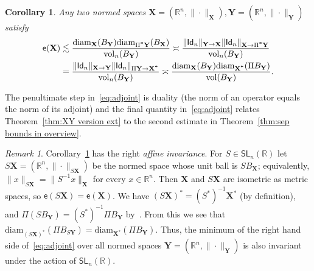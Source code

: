 \documentclass[11pt,reqno]{amsart}
\newcommand{\diam}{\mathrm{diam}}
\newcommand{\vr}{\mathrm{vr}}
\newcommand{\X}{\mathbf X}
\newcommand{\Y}{\mathbf Y}
\newcommand{\R}{\mathbb R}
\newtheorem{corollary}[theorem]{Corollary}
\theoremstyle{remark}
\newtheorem{remark}[theorem]{Remark}
\newcommand{\Id}{\mathsf{Id}}
\newcommand{\SL}{\mathsf{SL}}
\newcommand{\ee}{\mathsf{e}}
\newcommand{\vol}{\mathrm{vol}}
\renewcommand{\1}{\mathbf 1}
\begin{document}
\begin{corollary}\label{coro:analytic and geometric restatements} Any two normed spaces $\X=(\R^n,\|\cdot\|_{\X}), \Y=(\R^n,\|\cdot\|_{\Y})$ satisfy
\begin{align}\label{eq:adjoint}
\begin{split}
\ee(\X)&\lesssim  \frac{\diam_\X(B_\Y)\diam_{\Pi^{\textbf *} \Y}(B_\X)}{\vol_n(B_{\Y})}
\asymp  \frac{\|\Id_n\|_{\Y\to \X}\|\Id_n\|_{\X\to \Pi^{\textbf *} \Y}}{\vol_n(B_{\Y})}\\&=\frac{\|\Id_n\|_{\X\to \Y}\|\Id_n\|_{\Pi \Y\to \X^{\textbf *}}}{\vol_n(B_{\Y})}\asymp \frac{\diam_\X(B_\Y)\diam_{\X^{\textbf{*}}}(\Pi B_\Y)}{\vol(B_{\Y})}.
\end{split}
\end{align}
\end{corollary}
The penultimate step in~\eqref{eq:adjoint} is  duality (the norm of an operator equals the norm of its adjoint) and the final quantity in~\eqref{eq:adjoint} relates  Theorem~\ref{thm:XY version ext} to the second estimate in Theorem~\ref{thm:sep bounds in overview}.

\begin{remark}\label{rem:affine invariance} Corollary~\ref{coro:analytic and geometric restatements} has the right {\em affine invariance}. For  $S\in \SL_n(\R)$ let $S\X=(\R^n,\|\cdot\|_{S\X})$ be the normed space whose unit ball is $SB_\X$; equivalently, $\|x\|_{S\X}=\|S^{-1}x\|_\X$ for every $x\in \R^n$. Then $\X$ and $S\X$ are isometric as metric spaces, so $\ee(S\X)=\ee(\X)$.
We have $(S\X)^*=(S^*)^{-1} \X^*$ (by definition), and  $\Pi (SB_\Y)=(S^*)^{-1}\Pi B_\Y$ by~\cite{Pet67}. From this we see that $\diam_{(S \X)^{\textbf{*}}}(\Pi B_{S\Y})=\diam_{\X^{\textbf{*}}}(\Pi B_\Y)$. Thus, the minimum of the right hand side of~\eqref{eq:adjoint} over all normed spaces $\Y=(\R^n,\|\cdot\|_\Y)$ is also invariant under the action of $\SL_n(\R)$.
\end{remark}
\end{document}
